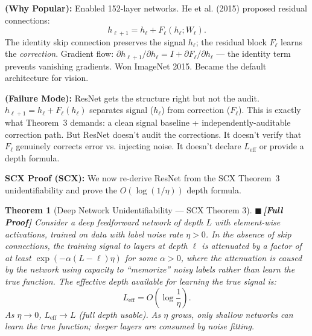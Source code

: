 \documentclass[12pt,a4paper]{article}
\newtheorem{theorem}{Theorem}[section]
\theoremstyle{definition}
\newcommand{\rigorFull}{{\color{rigorcolor}$\blacksquare$\,\textbf{[Full Proof]}}}
\newcommand{\SCX}{\textsc{SCX}}
\newcommand{\whyPopular}{\noindent\textbf{ (Why Popular):} }
\newcommand{\whyFail}{\noindent\textbf{ (Failure Mode):} }
\newcommand{\scxProof}{\noindent\textbf{SCX Proof (SCX):} }
\begin{document}
\whyPopular{} Enabled 152-layer networks. He et al. (2015) proposed residual connections:
\[
h_{\ell+1} = h_\ell + F_\ell(h_\ell; W_\ell).
\]
The identity skip connection preserves the signal $h_\ell$; the residual block $F_\ell$ learns the \textit{correction}. Gradient flow: $\partial h_{\ell+1}/\partial h_\ell = I + \partial F_\ell/\partial h_\ell$ — the identity term prevents vanishing gradients. Won ImageNet 2015. Became the default architecture for vision.

\whyFail{} ResNet gets the structure right but not the audit. $h_{\ell+1} = h_\ell + F_\ell(h_\ell)$ separates signal ($h_\ell$) from correction ($F_\ell$). This is exactly what Theorem~3 demands: a clean signal baseline + independently-auditable correction path. But ResNet doesn't audit the corrections. It doesn't verify that $F_\ell$ genuinely corrects error vs. injecting noise. It doesn't declare $L_{\text{eff}}$ or provide a depth formula.

\scxProof{} We now re-derive ResNet from the \SCX{} Theorem~3 unidentifiability and prove the $O(\log(1/\eta))$ depth formula.

\begin{theorem}[Deep Network Unidentifiability — SCX Theorem 3]\label{thm:unidentifiability}
\rigorFull
Consider a deep feedforward network of depth $L$ with element-wise activations, trained on data with label noise rate $\eta > 0$. In the absence of skip connections, the training signal to layers at depth $\ell$ is attenuated by a factor of at least $\exp(-\alpha(L-\ell)\eta)$ for some $\alpha > 0$, where the attenuation is caused by the network using capacity to ``memorize'' noisy labels rather than learn the true function. The effective depth available for learning the true signal is:
\begin{equation}\label{eq:effective_depth}
    L_{\text{eff}} = O\left(\log\frac{1}{\eta}\right).
\end{equation}
As $\eta \to 0$, $L_{\text{eff}} \to L$ (full depth usable). As $\eta$ grows, only shallow networks can learn the true function; deeper layers are consumed by noise fitting.
\end{theorem}
\end{document}
